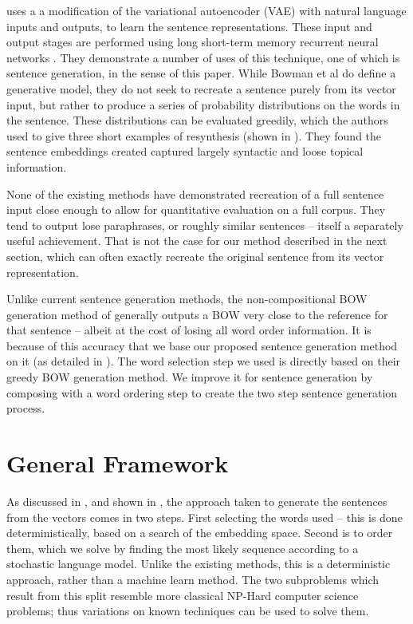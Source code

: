 \documentclass[11pt]{article}
\theoremstyle{plain}
\theoremstyle{definition}
\newcommand{\parencite}{\protect\cite}
\newcommand{\textcite}{\protect\newcite}
\begin{document}

\textcite{Bowman2015SmoothGeneration} uses a a modification of the variational autoencoder (VAE) \parencite{kingma2013auto} with natural language inputs and outputs, to learn the sentence representations. These input and output stages are performed using long short-term memory recurrent neural networks \parencite{hochreiter1997long}. They demonstrate a number of uses of this technique, one of which is sentence generation, in the sense of this paper.
While Bowman et al do define a generative model, they do not seek to recreate a sentence purely from its vector input, but rather to produce a series of probability distributions on the words in the sentence. These distributions can be evaluated greedily, which the authors used to give three short examples of resynthesis (shown in ). They found the sentence embeddings created captured largely syntactic and loose topical information. 

None of the existing methods have demonstrated recreation of a full sentence input close enough to allow for quantitative evaluation on a full corpus. They tend to output lose paraphrases, or roughly similar sentences -- itself a separately useful achievement.  That is not the case for our method described in the next section, which can often exactly recreate the original sentence from its vector representation.

Unlike current sentence generation methods, the non-compositional BOW generation method of \textcite{White2015BOWgen} generally outputs a BOW very close to the reference for that sentence -- albeit at the cost of losing all word order information. It is because of this accuracy that we base our proposed sentence generation method on it (as detailed in ). The word selection step we used is directly based on their greedy BOW generation method. We improve it for sentence generation by composing with a word ordering step to create the two step sentence generation process.



\section{General Framework}\label{framework}
As discussed in , and shown in , the approach taken to generate the sentences from the vectors comes in two steps. First selecting the words used -- this is done deterministically, based on a search of the embedding space. Second is to order them, which we solve by finding the most likely sequence according to a stochastic language model. Unlike the existing methods, this is a deterministic approach, rather than a machine learn method. The two subproblems which result from this split resemble more classical NP-Hard computer science problems; thus variations on known techniques can be used to solve them.
\end{document}
